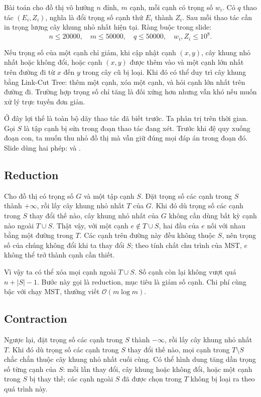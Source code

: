 \documentclass[11pt]{article}
\newcommand{\Oh}{\mathcal{O}}
\begin{document}
Bài toán cho đồ thị vô hướng \(n\) đỉnh, \(m\) cạnh, mỗi cạnh có trọng số
\(w_i\). Có \(q\) thao tác \((E_i,Z_i)\), nghĩa là đổi trọng số cạnh thứ
\(E_i\) thành \(Z_i\). Sau mỗi thao tác cần in trọng lượng cây khung nhỏ nhất
hiện tại. Ràng buộc trong slide:
\[
  n\le 20000,\quad m\le 50000,\quad q\le 50000,\quad
  w_i,Z_i\le 10^8.
\]

Nếu trọng số của một cạnh chỉ giảm, khi cập nhật cạnh \((x,y)\), cây khung nhỏ
nhất hoặc không đổi, hoặc cạnh \((x,y)\) được thêm vào và một cạnh lớn nhất
trên đường đi từ \(x\) đến \(y\) trong cây cũ bị loại. Khi đó có thể duy trì cây
khung bằng Link-Cut Tree: thêm một cạnh, xóa một cạnh, và hỏi cạnh lớn nhất
trên đường đi. Trường hợp trọng số chỉ tăng là đối xứng hơn nhưng vẫn khó nếu
muốn xử lý trực tuyến đơn giản.

Ở đây lợi thế là toàn bộ dãy thao tác đã biết trước. Ta phân trị trên thời
gian. Gọi \(S\) là tập cạnh bị sửa trong đoạn thao tác đang xét. Trước khi đệ
quy xuống đoạn con, ta muốn thu nhỏ đồ thị mà vẫn giữ đúng mọi đáp án trong
đoạn đó. Slide dùng hai phép:  và .

\subsection{Reduction}

Cho đồ thị có trọng số \(G\) và một tập cạnh \(S\). Đặt trọng số các cạnh
trong \(S\) thành \(+\infty\), rồi lấy cây khung nhỏ nhất \(T\) của \(G\).
Khi đó dù trọng số các cạnh trong \(S\) thay đổi thế nào, cây khung nhỏ nhất
của \(G\) không cần dùng bất kỳ cạnh nào ngoài \(T\cup S\). Thật vậy, với một
cạnh \(e\notin T\cup S\), hai đầu của \(e\) nối với nhau bằng một đường trong
\(T\). Các cạnh trên đường này đều không thuộc \(S\), nên trọng số của chúng
không đổi khi ta thay đổi \(S\); theo tính chất chu trình của MST, \(e\) không
thể trở thành cạnh cần thiết.

Vì vậy ta có thể xóa mọi cạnh ngoài \(T\cup S\). Số cạnh còn lại không vượt
quá \(n+|S|-1\). Bước này gọi là reduction, mục tiêu là giảm số cạnh. Chi phí
cùng bậc với chạy MST, thường viết \(\Oh(m\log m)\).

\subsection{Contraction}

Ngược lại, đặt trọng số các cạnh trong \(S\) thành \(-\infty\), rồi lấy cây
khung nhỏ nhất \(T\). Khi đó dù trọng số các cạnh trong \(S\) thay đổi thế
nào, mọi cạnh trong \(T\setminus S\) chắc chắn thuộc cây khung nhỏ nhất cuối
cùng. Có thể hình dung tăng dần trọng số từng cạnh của \(S\): mỗi lần thay đổi,
cây khung hoặc không đổi, hoặc một cạnh trong \(S\) bị thay thế; các cạnh
ngoài \(S\) đã được chọn trong \(T\) không bị loại ra theo quá trình này.
\end{document}
